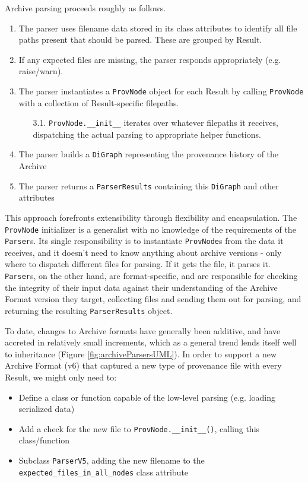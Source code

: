 Archive parsing proceeds roughly as follows.
\begin{enumerate}
    \item The parser uses filename data stored in its class attributes to
        identify all file paths present that should be parsed. These are grouped by
        Result.
    \item If any expected files are missing, the parser responds appropriately (e.g. raise/warn).
    \item The parser instantiates a \texttt{ProvNode} object for each Result by
        calling \texttt{ProvNode} with a collection of Result-specific filepaths.
    \begin{enumerate}
        \item[3.1.]\texttt{ProvNode.\_\_init\_\_} iterates over whatever
            filepaths it receives, dispatching the actual parsing to appropriate
            helper functions. 
    \end{enumerate}
    \item The parser builds a \texttt{DiGraph} representing the provenance
        history of the Archive
    \item The parser returns a \texttt{ParserResults} containing this
        \texttt{DiGraph} and other attributes
\end{enumerate}

This approach forefronts extensibility through flexibility and encapsulation.
The \texttt{ProvNode} initializer is a generalist with no knowledge of the requirements
of the \texttt{Parser}s. Its single responsibility is to instantiate \texttt{ProvNode}s from the
data it receives, and it doesn’t need to know anything about archive versions -
only where to dispatch different files for parsing. If it gets the file, it
parses it. \texttt{Parser}s, on the other hand, are format-specific, and are responsible
for checking the integrity of their input data against their understanding of
the Archive Format version they target, collecting files and sending them out
for parsing, and returning the resulting \texttt{ParserResults} object.

To date, changes to Archive formats have generally been additive, and have
accreted in relatively small increments, which as a general trend lends itself
well to inheritance (Figure \ref{fig:archiveParsersUML}). In order to support a new Archive Format (v6) that captured
a new type of provenance file with every Result, we might only need to:
\begin{itemize}
    \item Define a class or function capable of the low-level parsing (e.g. loading serialized data)
    \item Add a check for the new file to \texttt{ProvNode.\_\_init\_\_()}, calling this class/function
    \item Subclass \texttt{ParserV5}, adding the new filename to the
        \texttt{expected\_files\_in\_all\_nodes} class attribute
\end{itemize}

